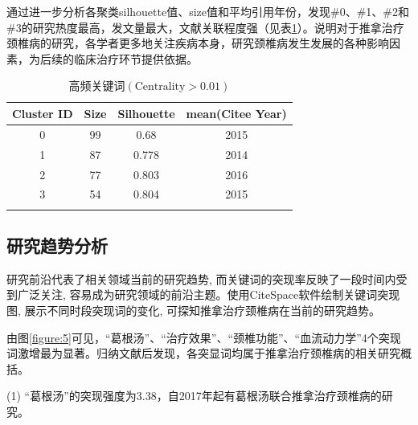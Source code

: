 \documentclass[lang=cn,11pt,a4paper,cite=super,AutoFakeBold,chinesefont=founder]{elegantpaper}
\begin{document}
通过进一步分析各聚类silhouette值、size值和平均引用年份，发现\#0、\#1、\#2和\#3的研究热度最高，发文量最大，文献关联程度强（见表\ref{tabular:2}）。说明对于推拿治疗颈椎病的研究，各学者更多地关注疾病本身，研究颈椎病发生发展的各种影响因素，为后续的临床治疗环节提供依据。

\begin{table}[!ht]
  \caption{高频关键词$(\text{Centrality} > 0.01)$}
    \centering
    \begin{tabular}{*4{c}}
    \toprule
    Cluster ID & Size & Silhouette & mean(Citee Year) \\
    \midrule
    0          & 99   & 0.68       & 2015             \\
    1          & 87   & 0.778      & 2014             \\
    2          & 77   & 0.803      & 2016             \\
    3          & 54   & 0.804      & 2015             \\
    \bottomrule
    \label{tabular:2}
    \end{tabular}
  \end{table}


\subsection{研究趋势分析} %

研究前沿代表了相关领域当前的研究趋势, 而关键词的突现率反映了一段时间内受到广泛关注, 容易成为研究领域的前沿主题。使用CiteSpace软件绘制关键词突现图, 展示不同时段突现词的变化, 可探知推拿治疗颈椎病在当前的研究趋势。


由图\ref{figure:5}可见，“葛根汤”、“治疗效果”、“颈椎功能”、“血流动力学”4个突现词激增最为显著。归纳文献后发现，各突显词均属于推拿治疗颈椎病的相关研究概括。

(1) “葛根汤”的突现强度为3.38，自2017年起有葛根汤联合推拿治疗颈椎病的研究。
\end{document}
